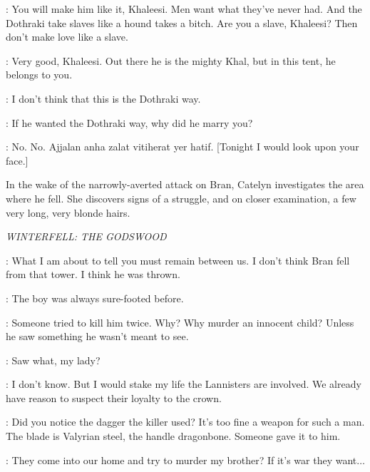 \DOREAH: You will make him like it, Khaleesi. Men want what they've never had. And the Dothraki take slaves like a hound takes a bitch. Are you a slave, Khaleesi? Then don't make love like a slave. 


\DOREAH: Very good, Khaleesi. Out there he is the mighty Khal, but in this tent, he belongs to you. 

\DAENERYS: I don't think that this is the Dothraki way. 

\DOREAH: If he wanted the Dothraki way, why did he marry you? 


\DAENERYS: No. No. Ajjalan anha zalat vitiherat yer hatif. [Tonight I would look upon your face.] 



\scene

\n In the wake of the narrowly-averted attack on Bran, Catelyn investigates the area where he fell. She discovers signs of a struggle, and on closer examination, a few very long, very blonde hairs.


\scene

\textit{WINTERFELL: THE GODSWOOD}


\CATELYN: What I am about to tell you must remain between us. I don't think Bran fell from that tower. I think he was thrown. 

\LUWIN: The boy was always sure-footed before. 

\CATELYN: Someone tried to kill him twice. Why? Why murder an innocent child? Unless he saw something he wasn't meant to see. 

\THEON: Saw what, my lady? 

\CATELYN: I don't know. But I would stake my life the Lannisters are involved. We already have reason to suspect their loyalty to the crown. 

\RODRIK: Did you notice the dagger the killer used? It's too fine a weapon for such a man. The blade is Valyrian steel, the handle dragonbone. Someone gave it to him. 

\ROBB: They come into our home and try to murder my brother? If it's war they want$\ldots$ 

